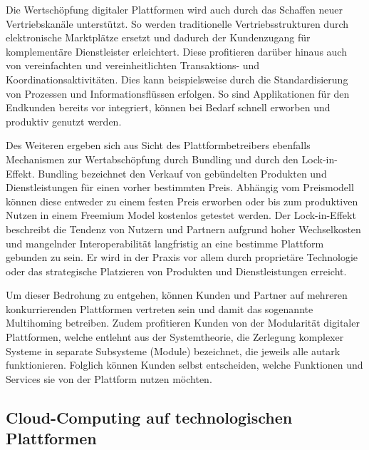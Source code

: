 Die Wertschöpfung digitaler Plattformen wird auch durch das Schaffen neuer Vertriebskanäle unterstützt. So werden traditionelle Vertriebsstrukturen durch elektronische Marktplätze ersetzt und dadurch der Kundenzugang für komplementäre Dienstleister erleichtert. Diese profitieren darüber hinaus auch von vereinfachten und vereinheitlichten Transaktions- und Koordinationsaktivitäten. Dies kann beispielsweise durch die Standardisierung von Prozessen und Informationsflüssen erfolgen. So sind Applikationen für den Endkunden bereits vor integriert, können bei Bedarf schnell erworben und produktiv genutzt werden.\autocite[Vgl.][S. 599f.]{HAHN2016}

Des Weiteren ergeben sich aus Sicht des Plattformbetreibers ebenfalls Mechanismen zur Wertabschöpfung durch Bundling und durch den Lock-in-Effekt. Bundling bezeichnet den Verkauf von gebündelten Produkten und Dienstleistungen für einen vorher bestimmten Preis. Abhängig vom Preismodell können diese entweder zu einem festen Preis erworben oder bis zum produktiven Nutzen in einem Freemium Model kostenlos getestet werden.\autocite[Vgl.][S. 178-185]{TEECE2010} Der Lock-in-Effekt beschreibt die Tendenz von Nutzern und Partnern aufgrund hoher Wechselkosten und mangelnder Interoperabilität langfristig an eine bestimme Plattform gebunden zu sein. \autocite[Vgl.][S. 22]{STEUR2022} Er wird in der Praxis vor allem durch proprietäre Technologie oder das strategische Platzieren von Produkten und Dienstleistungen erreicht. \autocite[Vgl.][S. 704]{BALLON2011}

Um dieser Bedrohung zu entgehen, können Kunden und Partner auf mehreren konkurrierenden Plattformen vertreten sein und damit das sogenannte Multihoming betreiben. \autocite[Vgl.][S. 461ff]{CENNAMO2018} Zudem profitieren Kunden von der Modularität digitaler Plattformen, welche entlehnt aus der Systemtheorie, die Zerlegung komplexer Systeme in separate Subsysteme (Module) bezeichnet, die jeweils alle autark funktionieren. \autocite[Vgl.][S. 2]{LECHNER2019} Folglich können Kunden selbst entscheiden, welche Funktionen und Services sie von der Plattform nutzen möchten.


\subsection{Cloud-Computing auf technologischen Plattformen}\label{sec:TechPCloud}

